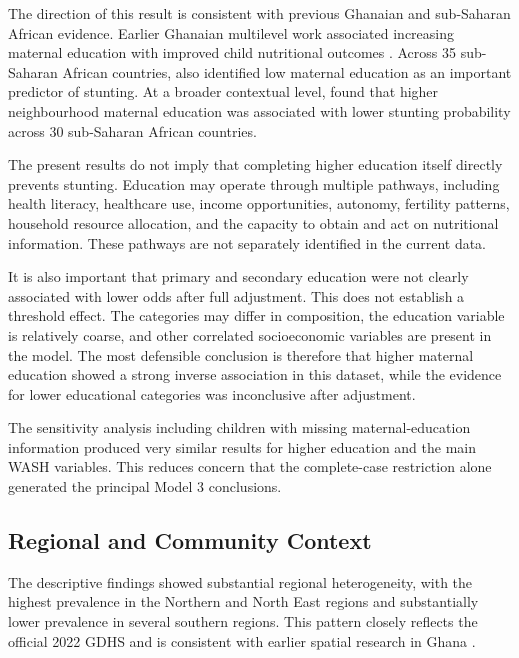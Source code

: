 The direction of this result is consistent with previous Ghanaian and sub-Saharan African evidence. Earlier Ghanaian multilevel work associated increasing maternal education with improved child nutritional outcomes \citep{AhetoEtAl2015}. Across 35 sub-Saharan African countries, \citet{TakeleEtAl2022} also identified low maternal education as an important predictor of stunting. At a broader contextual level, \citet{AgyenEtAl2024} found that higher neighbourhood maternal education was associated with lower stunting probability across 30 sub-Saharan African countries.

The present results do not imply that completing higher education itself directly prevents stunting. Education may operate through multiple pathways, including health literacy, healthcare use, income opportunities, autonomy, fertility patterns, household resource allocation, and the capacity to obtain and act on nutritional information. These pathways are not separately identified in the current data.

It is also important that primary and secondary education were not clearly associated with lower odds after full adjustment. This does not establish a threshold effect. The categories may differ in composition, the education variable is relatively coarse, and other correlated socioeconomic variables are present in the model. The most defensible conclusion is therefore that higher maternal education showed a strong inverse association in this dataset, while the evidence for lower educational categories was inconclusive after adjustment.

The sensitivity analysis including children with missing maternal-education information produced very similar results for higher education and the main WASH variables. This reduces concern that the complete-case restriction alone generated the principal Model 3 conclusions.

\subsection{Regional and Community Context}

The descriptive findings showed substantial regional heterogeneity, with the highest prevalence in the Northern and North East regions and substantially lower prevalence in several southern regions. This pattern closely reflects the official 2022 GDHS and is consistent with earlier spatial research in Ghana \citep{GSSICF2024,AhetoDagne2021,AmoakoJohnson2022}.

